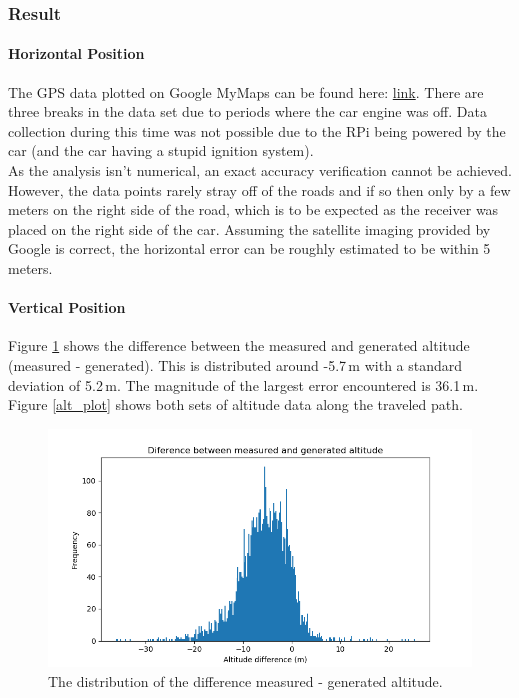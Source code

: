 \subsubsection*{Result}
\vspace{-.3cm}
\paragraph{Horizontal Position}
The GPS data plotted on Google MyMaps can be found here: \href{https://drive.google.com/open?id=1pnCSIn2Zt-UFfs62nne9t4oyZEai1yfZ&usp=sharing}{link}. There are three breaks in the data set due to periods where the car engine was off. Data collection during this time was not possible due to the RPi being powered by the car (and the car having a stupid ignition system). \\

As the analysis isn't numerical, an exact accuracy verification cannot be achieved. However, the data points rarely stray off of the roads and if so then only by a few meters on the right side of the road, which is to be expected as the receiver was placed on the right side of the car. Assuming the satellite imaging provided by Google is correct, the horizontal error can be roughly estimated to be within 5 meters.

\paragraph{Vertical Position}

Figure \ref{alt_comp} shows the difference between the measured and generated altitude (measured - generated). This is distributed around -5.7\,m with a standard deviation of 5.2\,m. The magnitude of the largest error encountered is 36.1\,m. Figure \ref{alt_plot} shows both sets of altitude data along the traveled path.

\begin{figure}[H]
	\includegraphics[width=\textwidth]{appendix/img/test-results/gps_alt_comp.png}
	\caption{The distribution of the difference measured - generated altitude.}
	\label{alt_comp}
\end{figure}

